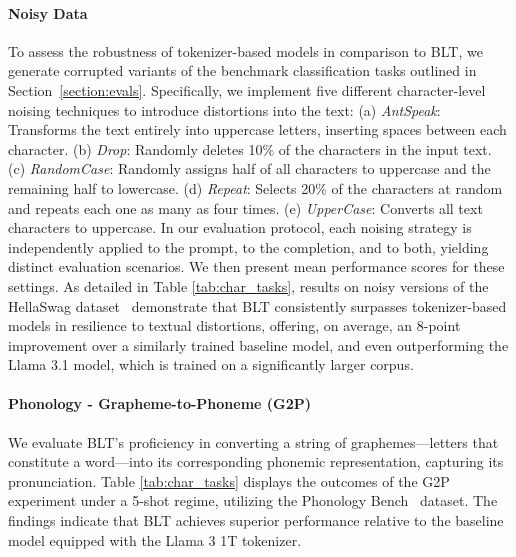 \paragraph{Noisy Data} To assess the robustness of tokenizer-based models in comparison to {\textsc BLT}, we generate corrupted variants of the benchmark classification tasks outlined in Section~\ref{section:evals}. Specifically, we implement five different character-level noising techniques to introduce distortions into the text: (a) \textit{AntSpeak}: Transforms the text entirely into uppercase letters, inserting spaces between each character. (b) \textit{Drop}: Randomly deletes 10\% of the characters in the input text. (c) \textit{RandomCase}: Randomly assigns half of all characters to uppercase and the remaining half to lowercase. (d) \textit{Repeat}: Selects 20\% of the characters at random and repeats each one as many as four times. (e) \textit{UpperCase}: Converts all text characters to uppercase. In our evaluation protocol, each noising strategy is independently applied to the prompt, to the completion, and to both, yielding distinct evaluation scenarios. We then present mean performance scores for these settings. As detailed in Table \ref{tab:char_tasks}, results on noisy versions of the HellaSwag dataset~\citep{Eval_hellaswag} demonstrate that {\textsc BLT} consistently surpasses tokenizer-based models in resilience to textual distortions, offering, on average, an 8-point improvement over a similarly trained baseline model, and even outperforming the Llama 3.1 model, which is trained on a significantly larger corpus.

\paragraph{Phonology - Grapheme-to-Phoneme (G2P)} We evaluate {\textsc BLT}'s proficiency in converting a string of graphemes—letters that constitute a word—into its corresponding phonemic representation, capturing its pronunciation. Table \ref{tab:char_tasks} displays the outcomes of the G2P experiment under a 5-shot regime, utilizing the Phonology Bench~\citep{suvarna2024phonologybench} dataset. The findings indicate that {\textsc BLT} achieves superior performance relative to the baseline model equipped with the Llama 3 1T tokenizer.

